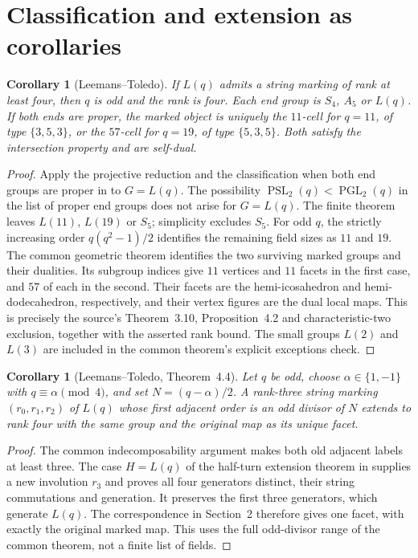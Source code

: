 \documentclass[11pt]{article}
\newtheorem{corollary}[theorem]{Corollary}
\newcommand{\PSL}{\operatorname{PSL}_2}
\newcommand{\PGL}{\operatorname{PGL}_2}
\begin{document}
\section{Classification and extension as corollaries}
\begin{corollary}[Leemans--Toledo]\label{cor:classification}
If $L(q)$ admits a string marking of rank at least four, then $q$ is odd
and the rank is four. Each end group is $S_4$, $A_5$ or $L(q)$.
If both ends are proper, the marked object is uniquely the $11$-cell for
$q=11$, of type $\{3,5,3\}$, or the $57$-cell for $q=19$, of type
$\{5,3,5\}$. Both satisfy the intersection property and are self-dual.
\end{corollary}
\begin{proof}
Apply the projective reduction and the classification when both end groups are proper in
\cite[Theorems~4 and~6]{U} to $G=L(q)$. The possibility $\PSL(q)<\PGL(q)$ in the list of proper end groups
does not arise for $G=L(q)$. The finite
theorem leaves $L(11)$, $L(19)$ or $S_5$; simplicity excludes $S_5$.
For odd $q$, the strictly increasing order $q(q^2-1)/2$ identifies the
remaining field sizes as $11$ and $19$. The common geometric theorem
identifies the two surviving marked groups and their
dualities. Its subgroup indices give $11$ vertices and $11$ facets in
the first case, and $57$ of each in the second. Their facets are the
hemi-icosahedron and hemi-dodecahedron, respectively, and their vertex
figures are the dual local maps. This is precisely the source's
Theorem~3.10, Proposition~4.2 and characteristic-two exclusion, together
with the asserted rank bound. The small groups $L(2)$ and $L(3)$ are
included in the common theorem's explicit exceptions check.
\end{proof}

\begin{corollary}[Leemans--Toledo, Theorem~4.4]\label{cor:extension}
Let $q$ be odd, choose $\alpha\in\{1,-1\}$ with
$q\equiv\alpha\pmod4$, and set $N=(q-\alpha)/2$. A rank-three string
marking $(r_0,r_1,r_2)$ of $L(q)$ whose first adjacent order is an odd
divisor of $N$ extends to rank four with the same group and the original
map as its unique facet.
\end{corollary}
\begin{proof}
The common indecomposability argument makes both old adjacent labels
at least three. The case $H=L(q)$ of the half-turn extension theorem in
\cite[Theorem~9]{U} supplies a new
involution $r_3$ and proves all four generators distinct, their string
commutations and generation. It preserves the first three generators,
which generate $L(q)$. The correspondence in Section~2 therefore gives
one facet, with exactly the original marked map. This uses the full
odd-divisor range of the common theorem, not a finite list of fields.
\end{proof}
\end{document}
